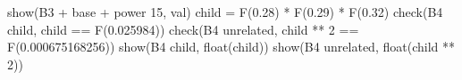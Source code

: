 \documentclass[
]{article}
\newenvironment{Shaded}{}{}
\newcommand{\BuiltInTok}[1]{\textcolor[rgb]{0.00,0.50,0.00}{#1}}
\newcommand{\DecValTok}[1]{\textcolor[rgb]{0.25,0.63,0.44}{#1}}
\newcommand{\NormalTok}[1]{#1}
\newcommand{\OperatorTok}[1]{\textcolor[rgb]{0.40,0.40,0.40}{#1}}
\newcommand{\StringTok}[1]{\textcolor[rgb]{0.25,0.44,0.63}{#1}}
\begin{document}
\begin{Shaded}
\begin{Highlighting}[]
\NormalTok{        show(}\StringTok{\textquotesingle{}B3 \textquotesingle{}} \OperatorTok{+}\NormalTok{ base }\OperatorTok{+} \StringTok{\textquotesingle{} power 15\textquotesingle{}}\NormalTok{, val)}
\NormalTok{    child }\OperatorTok{=}\NormalTok{ F(}\StringTok{\textquotesingle{}0.28\textquotesingle{}}\NormalTok{) }\OperatorTok{*}\NormalTok{ F(}\StringTok{\textquotesingle{}0.29\textquotesingle{}}\NormalTok{) }\OperatorTok{*}\NormalTok{ F(}\StringTok{\textquotesingle{}0.32\textquotesingle{}}\NormalTok{)}
\NormalTok{    check(}\StringTok{\textquotesingle{}B4 child\textquotesingle{}}\NormalTok{, child }\OperatorTok{==}\NormalTok{ F(}\StringTok{\textquotesingle{}0.025984\textquotesingle{}}\NormalTok{))}
\NormalTok{    check(}\StringTok{\textquotesingle{}B4 unrelated\textquotesingle{}}\NormalTok{, child }\OperatorTok{**} \DecValTok{2} \OperatorTok{==}\NormalTok{ F(}\StringTok{\textquotesingle{}0.000675168256\textquotesingle{}}\NormalTok{))}
\NormalTok{    show(}\StringTok{\textquotesingle{}B4 child\textquotesingle{}}\NormalTok{, }\BuiltInTok{float}\NormalTok{(child))}
\NormalTok{    show(}\StringTok{\textquotesingle{}B4 unrelated\textquotesingle{}}\NormalTok{, }\BuiltInTok{float}\NormalTok{(child }\OperatorTok{**} \DecValTok{2}\NormalTok{))}



\end{Highlighting}
\end{Shaded}
\end{document}
